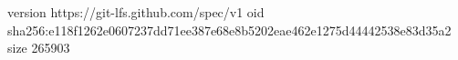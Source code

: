 version https://git-lfs.github.com/spec/v1
oid sha256:e118f1262e0607237dd71ee387e68e8b5202eae462e1275d44442538e83d35a2
size 265903
